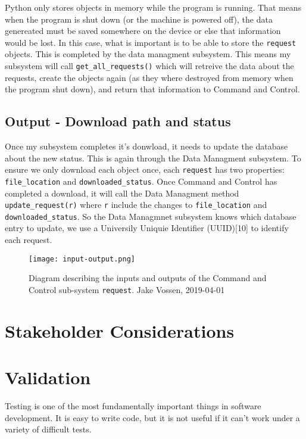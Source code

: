 \documentclass{article}
\begin{document}
Python only stores objects in memory while the program is
running. That means when the program is shut down (or the machine is
powered off), the data genereated must be saved somewhere on the
device or else that information would be lost. In this case, what is
important is to be able to store the \texttt{request} objects. This is
completed by the data managment subsystem. This means my subsystem
will call \texttt{get\_all\_requests()} which will retreive the data
about the requests, create the objects again (as they where destroyed
from memory when the program shut down), and return that information
to Command and Control.

\subsection{Output - Download path and status}

Once my subsystem completes it's donwload, it needs to update the
database about the new status. This is again through the Data
Managment subsystem. To ensure we only download each object once, each
\texttt{request} has two properties: \texttt{file\_location} and
\texttt{downloaded\_status}. Once Command and Control has completed a
download, it will call the Data Managment method
\texttt{update\_request(r)} where \texttt{r} include the changes to
\texttt{file\_location} and \texttt{downloaded\_status}. So the
Data Managmnet subsystem knows which database entry to update, we use
a Universily Uniquie Identifier (UUID)[10] to identify each
request.

\begin{figure}[h]
  \centering
  \texttt{[image: input-output.png]}
  \caption{\begingroup \fontsize{10pt}{12pt}\selectfont Diagram
    describing the inputs and outputs of the Command and Control sub-system
    \texttt{request}. Jake Vossen, 2019-04-01 \endgroup}
\end{figure}

\section{Stakeholder Considerations}

\section{Validation}

Testing is one of the most fundamentally important things in software
development. It is easy to write code, but it is not useful if it
can't work under a variety of difficult tests.
\end{document}
